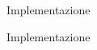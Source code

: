 \documentclass[compress]{beamer}
\begin{document}
\begin{frame}{Implementazione}
\end{frame}

\begin{frame}{Implementazione}
\end{frame}
\end{document}
